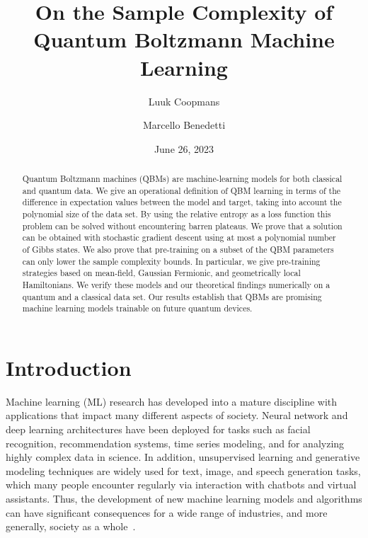 \documentclass[
    aps,
    prx,
    floatfix,
    nofootinbib,
    onecolumn
]{revtex4-2}
\begin{document}
\title{On the Sample Complexity of Quantum Boltzmann Machine Learning}

\author{Luuk Coopmans}

\author{Marcello Benedetti}

\date{June 26, 2023}

\begin{abstract}
Quantum Boltzmann machines (QBMs) are machine-learning models for both classical and quantum data. We give an operational definition of QBM learning in terms of the difference in expectation values between the model and target, taking into account the polynomial size of the data set.
By using the relative entropy as a loss function this problem can be solved without encountering barren plateaus.
We prove that a solution can be obtained with stochastic gradient descent using at most a polynomial number of Gibbs states. 
We also prove that pre-training on a subset of the QBM parameters can only lower the sample complexity bounds. In particular, we give pre-training strategies based on mean-field, Gaussian Fermionic, and geometrically local Hamiltonians. We verify these models and our theoretical findings numerically on a quantum and a classical data set. 
Our results establish that QBMs are promising machine learning models trainable on future quantum devices.
\end{abstract}

\maketitle

\section*{Introduction}

Machine learning (ML) research has developed into a mature discipline with applications that impact many different aspects of society. Neural network and deep learning architectures have been deployed for tasks such as facial recognition, recommendation systems, time series modeling, and for analyzing highly complex data in science. In addition, unsupervised learning and generative modeling techniques are widely used for text, image, and speech generation tasks, which many people encounter regularly via interaction with chatbots and virtual assistants. Thus, the development of new machine learning models and algorithms can have significant consequences for a wide range of industries, and more generally, society as a whole~\cite{Bommasani_2021}.
\end{document}
